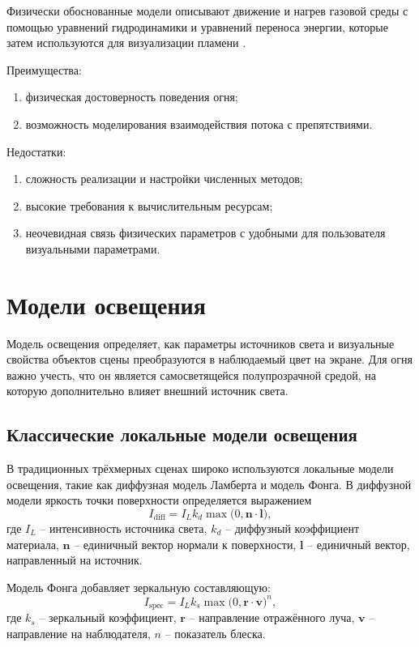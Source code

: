 Физически обоснованные модели описывают движение и нагрев газовой среды с помощью уравнений гидродинамики и уравнений переноса энергии, которые затем используются для визуализации пламени \cite{FoleyVanDam}.

Преимущества:
\begin{enumerate}
	\item физическая достоверность поведения огня;
	\item возможность моделирования взаимодействия потока с препятствиями.
\end{enumerate}

Недостатки:
\begin{enumerate}
	\item сложность реализации и настройки численных методов;
	\item высокие требования к вычислительным ресурсам;
	\item неочевидная связь физических параметров с удобными для пользователя визуальными параметрами.
\end{enumerate}

\section{Модели освещения}

Модель освещения определяет, как параметры источников света и визуальные свойства объектов сцены преобразуются в наблюдаемый цвет на экране. Для огня важно учесть, что он является самосветящейся полупрозрачной средой, на которую дополнительно влияет внешний источник света.

\subsection{Классические локальные модели освещения}

В традиционных трёхмерных сценах широко используются локальные модели освещения, такие как диффузная модель Ламберта и модель Фонга.\cite{FoleyVanDam} В диффузной модели яркость точки поверхности определяется выражением
\begin{equation}
	I_{\text{diff}} = I_{L} k_{d} \max\bigl(0, \mathbf{n} \cdot \mathbf{l}\bigr),
\end{equation}
где $I_{L}$ -- интенсивность источника света, $k_{d}$ -- диффузный коэффициент материала, $\mathbf{n}$ -- единичный вектор нормали к поверхности, $\mathbf{l}$ -- единичный вектор, направленный на источник.

Модель Фонга добавляет зеркальную составляющую:
\begin{equation}
	I_{\text{spec}} = I_{L} k_{s} \max\bigl(0, \mathbf{r} \cdot \mathbf{v}\bigr)^{n},
\end{equation}
где $k_{s}$ -- зеркальный коэффициент, $\mathbf{r}$ -- направление отражённого луча, $\mathbf{v}$ -- направление на наблюдателя, $n$ -- показатель блеска.\cite{FoleyVanDam}

